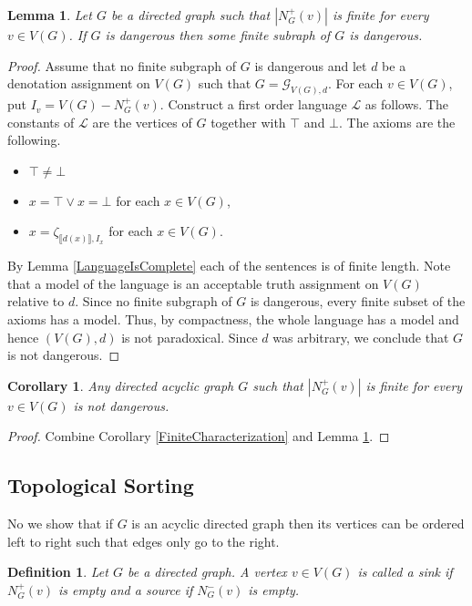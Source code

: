 \documentclass[12pt]{article}
\newtheorem{lem}[thm]{Lemma}
\newtheorem{cor}[thm]{Corollary}
\newtheorem{defn}{Definition}
\theoremstyle{remark}
\newcommand{\fancy}[1]{\mathcal{#1}}
\def\L{\fancy{L}}
\def\G{\fancy{G}}
\begin{document}
\begin{lem}\label{LocalFinite}
Let $G$ be a directed graph such that $|N^{+}_G(v)|$ is finite for every $v \in V(G)$.  If $G$ is dangerous then some finite subraph of $G$ is dangerous.
\end{lem}
\begin{proof}
Assume that no finite subgraph of $G$ is dangerous and let $d$ be a denotation assignment on $V(G)$ such that $G = \G_{V(G), d}$.  For each $v \in V(G)$, put $I_v = V(G) - N^+_G(v)$. Construct a first order language $\fancy{L}$ as follows.  The constants of $\L$ are the vertices of $G$ together with $\top$ and $\bot$.  The axioms are the following.

\begin{itemize}
\item $\top \neq \bot$
\item $x = \top \vee x = \bot$ for each $x \in V(G)$,
\item $x = \zeta_{\llbracket d(x) \rrbracket, I_x}$ for each $x \in V(G)$.
\end{itemize}

By Lemma \ref{LanguageIsComplete} each of the sentences is of finite length.  Note that a model of the language is an acceptable truth assignment on $V(G)$ relative to $d$.  Since no finite subgraph of $G$ is dangerous, every finite subset of the axioms has a model.  Thus, by compactness, the whole language has a model and hence $(V(G), d)$ is not paradoxical.  Since $d$ was arbitrary, we conclude that $G$ is not dangerous.
\end{proof}

\begin{cor}\label{AtLeastOneInfinite}
Any directed acyclic graph $G$ such that $|N^{+}_G(v)|$ is finite for every $v \in V(G)$ is not dangerous.
\end{cor}
\begin{proof}
Combine Corollary \ref{FiniteCharacterization} and Lemma \ref{LocalFinite}.
\end{proof}

\subsection{Topological Sorting}

No we show that if $G$ is an acyclic directed graph then its vertices can be ordered left to right such that edges only go to the right.  

\begin{defn}
Let $G$ be a directed graph.  A vertex $v \in V(G)$ is called a \emph{sink} if $N^+_G(v)$ is empty and a \emph{source} if $N^-_G(v)$ is empty.
\end{defn}
\end{document}
